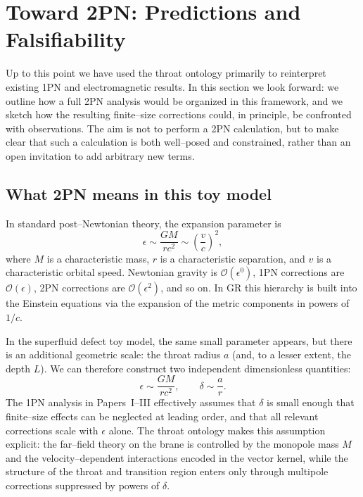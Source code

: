 \documentclass[12pt]{article}
\begin{document}
\section{Toward 2PN: Predictions and Falsifiability}
\label{sec:2pn_predictions}

Up to this point we have used the throat ontology primarily to reinterpret
existing 1PN and electromagnetic results.  In this section we look forward:
we outline how a full 2PN analysis would be organized in this framework, and
we sketch how the resulting finite--size corrections could, in principle, be
confronted with observations.  The aim is not to perform a 2PN calculation,
but to make clear that such a calculation is both well--posed and
constrained, rather than an open invitation to add arbitrary new terms.

\subsection{What 2PN means in this toy model}
\label{subsec:2pn_meaning}

In standard post--Newtonian theory, the expansion parameter is
\begin{equation}
  \epsilon
  \sim \frac{GM}{rc^2}
  \sim \left(\frac{v}{c}\right)^2,
\end{equation}
where $M$ is a characteristic mass, $r$ is a characteristic separation, and
$v$ is a characteristic orbital speed.  Newtonian gravity is $\mathcal{O}(\epsilon^0)$,
1PN corrections are $\mathcal{O}(\epsilon)$, 2PN corrections are
$\mathcal{O}(\epsilon^2)$, and so on.  In GR this hierarchy is built into
the Einstein equations via the expansion of the metric components in powers
of $1/c$.

In the superfluid defect toy model, the same small parameter appears, but
there is an additional geometric scale: the throat radius $a$ (and, to a
lesser extent, the depth $L$).  We can therefore construct two independent
dimensionless quantities:
\begin{equation}
  \epsilon
  \sim \frac{GM}{rc^2},
  \qquad
  \delta
  \sim \frac{a}{r}.
\end{equation}
The 1PN analysis in Papers~I--III effectively assumes that $\delta$ is small
enough that finite--size effects can be neglected at leading order, and that
all relevant corrections scale with $\epsilon$ alone.  The throat ontology
makes this assumption explicit: the far--field theory on the brane is
controlled by the monopole mass $M$ and the velocity--dependent interactions
encoded in the vector kernel, while the structure of the throat and
transition region enters only through multipole corrections suppressed by
powers of $\delta$.
\end{document}
